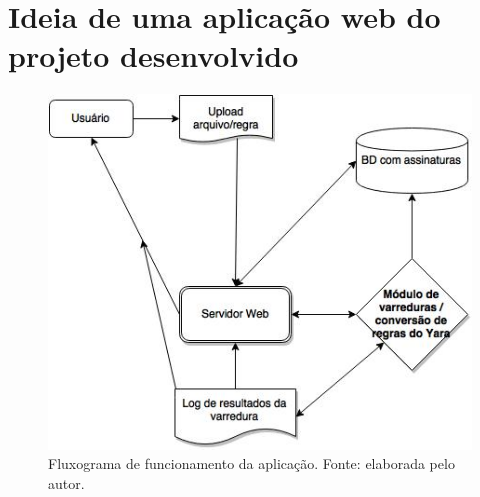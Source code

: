\section{Ideia de uma aplicação web do projeto desenvolvido}
\label{s.prototipo}

\begin{figure}
  \includegraphics[scale=0.6]{figs/flux_prototipo}
  \centering
  \caption{Fluxograma de funcionamento da aplicação. Fonte: elaborada pelo autor.}
  \label{f.flux_prototipo}
\end{figure}
